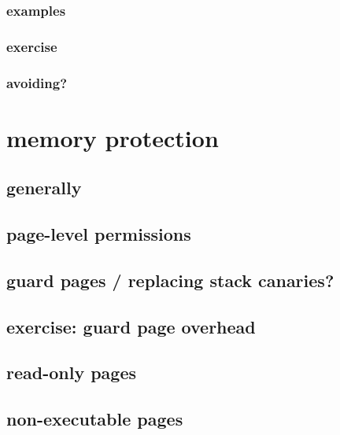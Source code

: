 \subsubsection{examples}


\subsubsection{exercise}


\subsubsection{avoiding?}



\section{memory protection}
\subsection{generally}


\subsection{page-level permissions}


\subsection{guard pages / replacing stack canaries?}


\subsection{exercise: guard page overhead}


\subsection{read-only pages}


\subsection{non-executable pages}



